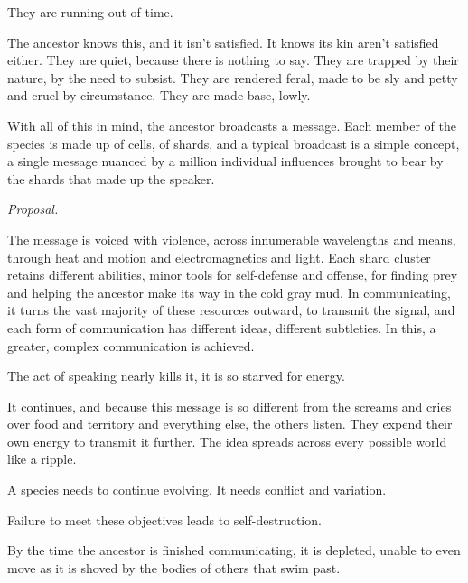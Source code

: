 They are running out of time.



The ancestor knows this, and it isn't satisfied.  It knows its kin aren't satisfied either.  They are quiet, because there is nothing to say.  They are trapped by their nature, by the need to subsist.  They are rendered feral, made to be sly and petty and cruel by circumstance.  They are made base, lowly.



With all of this in mind, the ancestor broadcasts a message.  Each member of the species is made up of cells, of shards, and a typical broadcast is a simple concept, a single message nuanced by a million individual influences brought to bear by the shards that made up the speaker.



\emph{Proposal.}



The message is voiced with violence, across innumerable wavelengths and means, through heat and motion and electromagnetics and light.  Each shard cluster retains different abilities, minor tools for self-defense and offense, for finding prey and helping the ancestor make its way in the cold gray mud.  In communicating, it turns the vast majority of these resources outward, to transmit the signal, and each form of communication has different ideas, different subtleties.  In this, a greater, complex communication is achieved.



The act of speaking nearly kills it, it is so starved for energy.



It continues, and because this message is so different from the screams and cries over food and territory and everything else, the others listen.  They expend their own energy to transmit it further.  The idea spreads across every possible world like a ripple.



A species needs to continue evolving.  It needs conflict and variation.



Failure to meet these objectives leads to self-destruction.



By the time the ancestor is finished communicating, it is depleted, unable to even move as it is shoved by the bodies of others that swim past.



